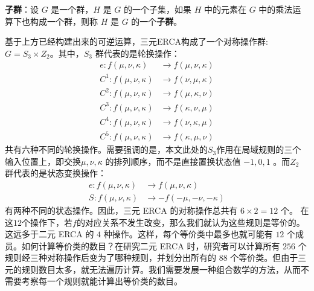 \documentclass[reprint, amsmath, amssymb, aps, physrev,prb]{revtex4-2}
\begin{document}
\textbf{子群}：设 $G$ 是一个群，$H$ 是 $G$ 的一个子集，如果 $H$ 中的元素在 $G$ 中的乘法运算下也构成一个群，则称 $H$ 是 $G$ 的一个\textbf{子群}。

基于上方已经构建出来的可逆运算，三元ERCA构成了一个对称操作群:$G = S_3 \times Z_2$。其中，$S_3$ 群代表的是轮换操作：
\begin{align}
    e:f(\mu,\nu,\kappa) &\to f(\mu,\nu,\kappa) \nonumber \\
    C^1 :f(\mu,\nu,\kappa) &\to f(\nu,\mu,\kappa) \nonumber \\
    C^2 :f(\mu,\nu,\kappa) &\to f(\mu,\kappa,\nu) \nonumber \\
    C^3 :f(\mu,\nu,\kappa) &\to f(\kappa,\nu,\mu) \nonumber \\
    C^4 :f(\mu,\nu,\kappa) &\to f(\nu,\kappa,\mu) \nonumber \\
    C^5 :f(\mu,\nu,\kappa) &\to f(\kappa,\mu,\nu) 
\end{align}
共有六种不同的轮换操作。需要强调的是，本文此处的$S_3$作用在局域规则的三个输入位置上，即交换$ μ,ν,κ$ 的排列顺序，而不是直接置换状态值 $−1,0,1$ 。而$Z_2$ 群代表的是状态变换操作：
\begin{align}
    e: f(\mu,\nu,\kappa) &\to f(\mu,\nu,\kappa) \nonumber \\
    S: f(\mu,\nu,\kappa) &\to -f(-\mu, -\nu, -\kappa) 
\end{align}
有两种不同的状态操作。因此，三元 ERCA 的对称操作总共有 $6 \times 2 = 12$ 个。
在这$12$个操作下，若$f$的对应关系不发生改变，那么我们就认为这些规则是等价的。
这远多于二元 ERCA 的 $4$ 种操作。这样，每个等价类中最多也就可能有 $12$ 个成员。如何计算等价类的数目？在研究二元 ERCA 时，研究者可以计算所有 $256$ 个规则经三种对称操作后变为了哪种规则，并划分出所有的 $88$ 个等价类。但由于三元的规则数目太多，就无法遍历计算。我们需要发展一种组合数学的方法，从而不需要考察每一个规则就能计算出等价类的数目。
\end{document}
